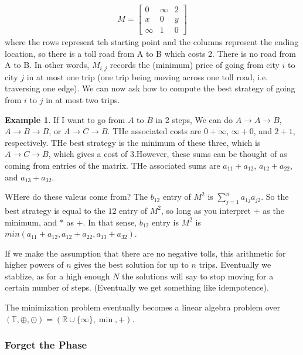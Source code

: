\documentclass[12pt]{memoir}
\theoremstyle{definition}
\newtheorem{protoexample}{Example}[section]
\newenvironment{ex}
   {\begin{protoexample}}
   {\end{protoexample}}
\def\RR{{\mathbb R}}
\begin{document}
\begin{align*}
    M= \begin{bmatrix}
        0 & \infty & 2
        \\
        x & 0 & y
        \\
        \infty & 1 & 0
    \end{bmatrix}
\end{align*}
where the rows represent teh starting point and the columns represent the ending location, so there is a toll road from A to B which costs 2. There is no road from A to B. In other words, $M_{i,j}$ records the (minimum) price of going from city $i$ to city $j$ in at most one trip (one trip being moving across one toll road, i.e. traversing one edge). We can now ask how to compute the best strategy of going from $i$ to $j$ in at most two trips.

\begin{ex}
    If I want to go from $A$ to $B$ in 2 steps, We can do $A \rightarrow A \rightarrow B$, $A \rightarrow B \rightarrow B$, or $A \rightarrow C \rightarrow B$. THe associated costs are $0+\infty$, $\infty + 0$, and $2 + 1$, respectively. THe best strategy is the minimum of these three, which is $A \rightarrow C \rightarrow B$, which gives a cost of $3$.However, these sums can be thought of as coming from entries of the matrix. THe associated sums are $a_{11}+a_{12}$, $a_{12}+a_{22}$, and $a_{13}+a_{32}$. 


    WHere do these valeus come from? The $b_{12}$ entry of $M^2$ is $\sum\limits_{j=1}^n a_{1j}a_{j2}$. So the best strategy is equal to the $12$ entry of $M^2$, so long as you interpret $+$ as the minimum, and $*$ as $+$. In that sense, $b_{12}$ entry is $M^2$ is $min(a_{11}+a_{12}, a_{12} +a_{22}, a_{13}+a_{32})$. 



    If we make the assumption that there are no negative tolls, this arithmetic for higher powers of $n$ gives the best solution for up to $n$ trips. Eventually we stablize, as for a high enough $N$ the solutions will say to stop moving for a certain number of steps. (Eventually we get something like idempotence).
\end{ex}


The minimization problem eventually becomes a linear algebra problem over $(\mathbb{T}, \oplus, \odot) = ( \RR \cup \{\infty\}, \min, +)$.


\subsubsection{Forget the Phase}
\end{document}

